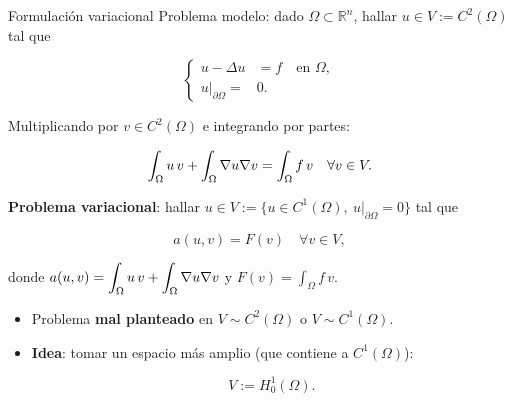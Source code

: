 \documentclass[10pt,leqno]{beamer}
\begin{document}
\begin{frame}{Formulación variacional}
  \small
  Problema modelo: dado $\Omega\subset\mathbb{R}^n$, hallar
  $u\in V:=C^2(\Omega)$ tal que
  \begin{block}{}
    \vspace{-1.1ex}
    \begin{equation*}
      \left\{
        \label{eq:1}
        \begin{aligned}
          u - \Delta u &= f \quad\text{en } \Omega,  \\
          u | _{\partial\Omega} =& 0.
        \end{aligned}
      \right.
    \end{equation*}
  \end{block}

  \vfill
  Multiplicando por $v\in C^2(\Omega)$ e integrando por partes:
  \vspace{-1.0ex}
  \begin{block}{}
    \vspace{-1.1ex}
    \begin{equation*}
      \label{eq:2}
      \int_\Omega u\,v + \int_\Omega\nabla u \nabla v = \int_\Omega f\,v
      \quad\forall v\in V.
    \end{equation*}
  \end{block}

  \vfill
  \textbf{Problema variacional}: hallar
  $u\in V:= \{u\in C^1(\Omega),\ u|_{\partial\Omega}=0\}$ tal que
    \vspace{-1.0ex}
  \begin{block}{}
    \vspace{-2.9ex}
    \begin{equation}
      \label{eq:pb.variacional}
      \tag{P}
    a(u,v)= F(v) \quad \forall v \in V,
  \end{equation}
  \end{block}
  \vspace{1ex} donde
  $\displaystyle a(u,v)=\int_\Omega u\,v + \int_\Omega\nabla u \nabla v$
  \quad y \quad $\displaystyle F(v) = \int_\Omega f\,v$.
  \begin{itemize}
  \item Problema \textbf{mal planteado} en $V\sim C^2(\Omega)$ o
    $V \sim C^1(\Omega)$.
  \item \textbf{Idea}: tomar un espacio más amplio (que contiene a $C^1(\Omega)$):
  \begin{block}{}
    \vspace{-1ex}
    $$
    V:=H_0^1(\Omega).
    $$
  \end{block}
\end{itemize}
\end{frame}
\end{document}
